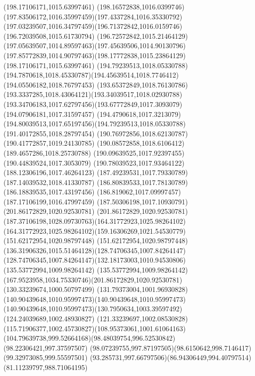 {    \moveto(198.17106171,1015.63997461)
    \curveto(198.16572838,1016.0399746)(197.83506172,1016.35997459)(197.4337284,1016.35330792)
    \curveto(197.03239507,1016.34797459)(196.71372842,1016.0159746)(196.72039508,1015.61730794)
    \curveto(196.72572842,1015.21464129)(197.05639507,1014.89597463)(197.45639506,1014.90130796)
    \curveto(197.85772839,1014.90797463)(198.17772838,1015.23864129)(198.17106171,1015.63997461)
    \moveto(194.79239513,1018.05330788)
    \curveto(194.7870618,1018.45330787)(194.45639514,1018.7746412)(194.05506182,1018.76797453)
    \curveto(193.65372849,1018.76130786)(193.3337285,1018.43064121)(193.34039517,1018.02930788)
    \curveto(193.34706183,1017.62797456)(193.67772849,1017.3093079)(194.07906181,1017.31597457)
    \curveto(194.4790618,1017.3213079)(194.80039513,1017.65197456)(194.79239513,1018.05330788)
    \moveto(191.40172855,1018.28797454)
    \lineto(190.76972856,1018.62130787)
    \lineto(190.41772857,1019.24130785)
    \lineto(190.08572858,1018.6106412)
    \lineto(189.4657286,1018.25730788)
    \lineto(190.09639525,1017.92397455)
    \lineto(190.44839524,1017.3053079)
    \lineto(190.78039523,1017.93464122)
    \closepath
    \moveto(188.12306196,1017.46264123)
    \lineto(187.49239531,1017.79330789)
    \lineto(187.14039532,1018.41330787)
    \lineto(186.80839533,1017.78130789)
    \lineto(186.18839535,1017.43197456)
    \lineto(186.819062,1017.09997457)
    \lineto(187.17106199,1016.47997459)
    \lineto(187.50306198,1017.10930791)
    \closepath
    \moveto(201.86172829,1020.92530781)
    \curveto(201.86172829,1020.92530781)(187.37106198,1028.09730763)(164.31772923,1025.98264102)
    \curveto(164.31772923,1025.98264102)(159.16306269,1021.54530779)(151.62172954,1020.98797448)
    \curveto(151.62172954,1020.98797448)(136.31906326,1015.51464128)(128.74706345,1007.84264147)
    \curveto(128.74706345,1007.84264147)(132.18173003,1010.94530806)(135.53772994,1009.98264142)
    \curveto(135.53772994,1009.98264142)(167.9523958,1034.75330746)(201.86172829,1020.92530781)
    \moveto(130.33239674,1000.50797499)
    \curveto(131.79373004,1001.96930828)(140.90439648,1010.95997473)(140.90439648,1010.95997473)
    \curveto(140.90439648,1010.95997473)(130.7950634,1003.39597492)(124.24039689,1002.48930827)
    \curveto(121.33239697,1002.08530828)(115.71906377,1002.45730827)(108.95373061,1001.61064163)
    \curveto(104.79639738,999.52664168)(98.48039754,996.52530842)(98.22306421,997.37597507)
    \curveto(98.07239755,997.87197505)(98.6150642,998.7146417)(99.32973085,999.55597501)
    \curveto(93.285731,997.66797506)(86.94306449,994.40797514)(81.11239797,988.71064195)
}

